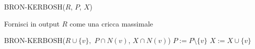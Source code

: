 \begin{algorithm}[H] 
    \caption{BRON-KERBOSH($R$, $P$, $X$)}\label{alg:bk1}
    \begin{algorithmic}[1]
            \State Fornisci in output $R$ come una cricca massimale
        \Else

                \State BRON-KERBOSH($R \cup \{v\},$ $P \cap N(v)$, $X \cap N(v)$)
                \State $P:= P \setminus \{v\}$
                \State $X:= X \cup \{v\}$
            \EndFor
        \EndIf
    \end{algorithmic}
\end{algorithm}